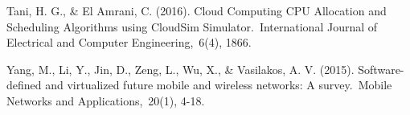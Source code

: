 \begin{thebibliography}{99}
\begin{LTRbibitems}
	  Tani, H. G., \& El Amrani, C. (2016). Cloud Computing CPU Allocation and Scheduling Algorithms using CloudSim Simulator. International Journal of Electrical and Computer Engineering, 6(4), 1866.



	Yang, M., Li, Y., Jin, D., Zeng, L., Wu, X., \& Vasilakos, A. V. (2015). Software-defined and virtualized future mobile and wireless networks: A survey. Mobile Networks and Applications, 20(1), 4-18.

	\end{LTRbibitems}
\end{thebibliography}
